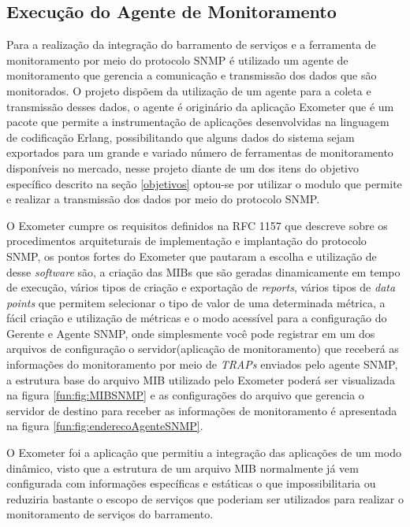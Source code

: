 \subsection{Execução do Agente de Monitoramento}

Para a realização da integração do barramento de serviços e a ferramenta de monitoramento por meio do protocolo \acrshort{SNMP} é utilizado um agente de monitoramento que gerencia a comunicação e transmissão dos dados que são monitorados. O projeto dispõem  da utilização de um agente para a coleta e transmissão desses dados, o agente é originário da aplicação Exometer que é um pacote que permite a instrumentação de aplicações desenvolvidas na linguagem de codificação Erlang, possibilitando que alguns dados do sistema sejam exportados para um grande e variado número de ferramentas de monitoramento disponíveis no mercado\cite{exometer_core}, nesse projeto diante de um dos itens do objetivo específico descrito na seção \ref{objetivos} optou-se por utilizar o modulo que permite e realizar a transmissão dos dados por meio do protocolo \acrshort{SNMP}. 

O Exometer cumpre os requisitos definidos na \acrshort{RFC} 1157 que descreve sobre os procedimentos arquiteturais de implementação e implantação do protocolo \acrshort{SNMP}, os pontos fortes do Exometer que pautaram a escolha e utilização de desse \textit{software} são, a criação das \acrshort{MIBs} que são geradas dinamicamente em tempo de execução, vários tipos de criação e exportação de \textit{reports}, vários tipos de \textit{data points} que permitem selecionar o tipo de valor de uma determinada métrica, a fácil criação e utilização de métricas e o modo  acessível
para a configuração do Gerente e Agente \acrshort{SNMP}, onde simplesmente você pode registrar em um dos arquivos de configuração o servidor(aplicação de monitoramento) que receberá as informações do monitoramento por meio de \textit{TRAPs} enviados pelo agente \acrshort{SNMP}, a estrutura base do arquivo MIB utilizado pelo Exometer poderá ser visualizada na figura \ref{fun:fig:MIBSNMP} e as configurações do arquivo que gerencia o servidor de destino para receber as informações de monitoramento é apresentada na figura \ref{fun:fig:enderecoAgenteSNMP}. 

O Exometer foi a aplicação que permitiu a integração das aplicações de um modo dinâmico, visto que a estrutura de um arquivo MIB normalmente já vem configurada com informações específicas e estáticas o que impossibilitaria ou reduziria bastante o escopo de serviços que poderiam ser utilizados para realizar o monitoramento de serviços do barramento. 

